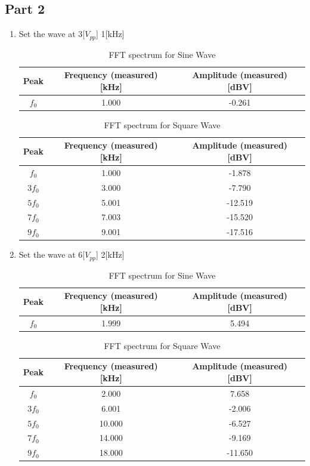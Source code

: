 \documentclass[12pt]{article}
\begin{document}
\subsection{Part 2}
\begin{enumerate}
\item Set the wave at 3[$V_{pp}$] 1[kHz]
\begin{table}[H]
\centering
\begin{tabular}{|c|c|c|}
\hline
Peak  & Frequency (measured) [kHz] & Amplitude (measured) [dBV] \\ \hline
$f_0$ & 1.000                      & -0.261                     \\ \hline
\end{tabular}
\caption{FFT spectrum for Sine Wave}
\end{table}
\begin{table}[H]
\centering
\begin{tabular}{|c|c|c|}
\hline
Peak  & Frequency (measured) [kHz] & Amplitude (measured) [dBV] \\ \hline
$f_0$ &1.000  &-1.878  \\ \hline
$3f_0$ &3.000  &-7.790  \\ \hline
$5f_0$ &5.001  &-12.519  \\ \hline
$7f_0$ &7.003  &-15.520  \\ \hline
$9f_0$ &9.001  &-17.516  \\ \hline
\end{tabular}
\caption{FFT spectrum for Square Wave}
\end{table}
\item Set the wave at 6[$V_{pp}$] 2[kHz]
\begin{table}
\centering
\begin{tabular}{|c|c|c|}
\hline
Peak  & Frequency (measured) [kHz] & Amplitude (measured) [dBV] \\ \hline
$f_0$ & 1.999                      & 5.494                     \\ \hline
\end{tabular}
\caption{FFT spectrum for Sine Wave}
\end{table}
\begin{table}[H]
\centering
\begin{tabular}{|c|c|c|}
\hline
Peak  & Frequency (measured) [kHz] & Amplitude (measured) [dBV] \\ \hline
$f_0$ &2.000  &7.658  \\ \hline
$3f_0$ &6.001  &-2.006  \\ \hline
$5f_0$ &10.000  &-6.527  \\ \hline
$7f_0$ &14.000  &-9.169  \\ \hline
$9f_0$ &18.000  &-11.650  \\ \hline
\end{tabular}
\caption{FFT spectrum for Square Wave}
\end{table}
\end{enumerate}
\end{document}
